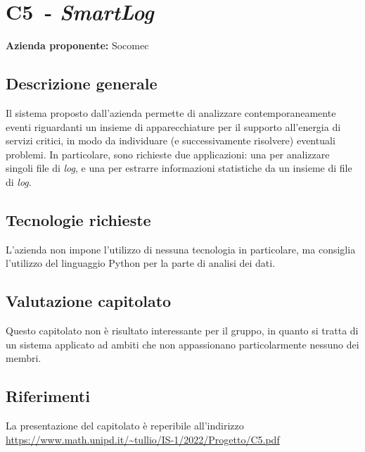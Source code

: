 
\renewcommand{\capName}{\textit{SmartLog}} %
\renewcommand{\capCode}{C5} %
\renewcommand{\capLink}{https://www.math.unipd.it/~tullio/IS-1/2022/Progetto/C5.pdf} %
\renewcommand{\capProposer}{Socomec} %


\section{\capCode\ - \capName}
\textbf{Azienda proponente:} Socomec
\subsection{Descrizione generale}
Il sistema proposto dall'azienda permette di analizzare contemporaneamente eventi riguardanti un insieme di apparecchiature per il supporto all'energia di servizi critici, in modo da individuare (e successivamente risolvere) eventuali problemi. In particolare, sono richieste due applicazioni: una per analizzare singoli file di \textit{log}, e una per estrarre informazioni statistiche da un insieme di file di \textit{log}.
\subsection{Tecnologie richieste}
L'azienda non impone l'utilizzo di nessuna tecnologia in particolare, ma consiglia l'utilizzo del linguaggio Python per la parte di analisi dei dati.
\subsection{Valutazione capitolato}
Questo capitolato non è risultato interessante per il gruppo, in quanto si tratta di un sistema applicato ad ambiti che non appassionano particolarmente nessuno dei membri.

\subsection{Riferimenti}
La presentazione del capitolato è reperibile all'indirizzo \url{\capLink}